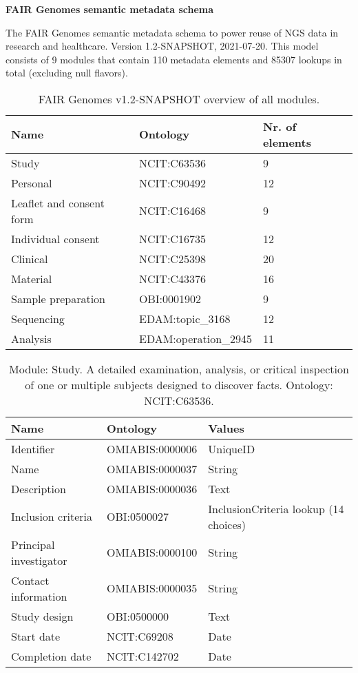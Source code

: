 \documentclass{article}
\begin{document}
\setlength\parindent{0pt}

\textbf{FAIR Genomes semantic metadata schema}
\newline

The FAIR Genomes semantic metadata schema to power reuse of NGS data in research and healthcare. Version 1.2-SNAPSHOT, 2021-07-20. This model consists of 9 modules that contain 110 metadata elements and 85307 lookups in total (excluding null flavors).

\begin{table}[htb]
\begin{tabular}{lll}
Name & Ontology & Nr. of elements \\
\hline
Study & NCIT:C63536 & 9 \\
Personal & NCIT:C90492 & 12 \\
Leaflet and consent form & NCIT:C16468 & 9 \\
Individual consent & NCIT:C16735 & 12 \\
Clinical & NCIT:C25398 & 20 \\
Material & NCIT:C43376 & 16 \\
Sample preparation & OBI:0001902 & 9 \\
Sequencing & EDAM:topic\_3168 & 12 \\
Analysis & EDAM:operation\_2945 & 11 \\
\hline
\end{tabular}
\caption[Module overview]{\label{table:table1} FAIR Genomes v1.2-SNAPSHOT overview of all modules.}
\end{table}

\begin{table}[htb]
\begin{tabular}{lll}
Name & Ontology & Values \\
\hline
Identifier & OMIABIS:0000006 & UniqueID \\
Name & OMIABIS:0000037 & String \\
Description & OMIABIS:0000036 & Text \\
Inclusion criteria & OBI:0500027 & InclusionCriteria lookup (14 choices) \\
Principal investigator & OMIABIS:0000100 & String \\
Contact information & OMIABIS:0000035 & String \\
Study design & OBI:0500000 & Text \\
Start date & NCIT:C69208 & Date \\
Completion date & NCIT:C142702 & Date \\
\hline
\end{tabular}
\caption[Module: Study]{\label{table:table2} Module: Study. A detailed examination, analysis, or critical inspection of one or multiple subjects designed to discover facts. Ontology: NCIT:C63536. }
\end{table}
\end{document}
